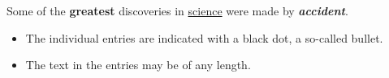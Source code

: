 \documentclass{article}
\begin{document}
Some of the \textbf{greatest}
discoveries in \underline{science} 
were made by \textbf{\textit{accident}}.
\begin{itemize}
  \item The individual entries are indicated with a black dot, a so-called bullet.
  \item The text in the entries may be of any length.
\end{itemize}
\end{document}
